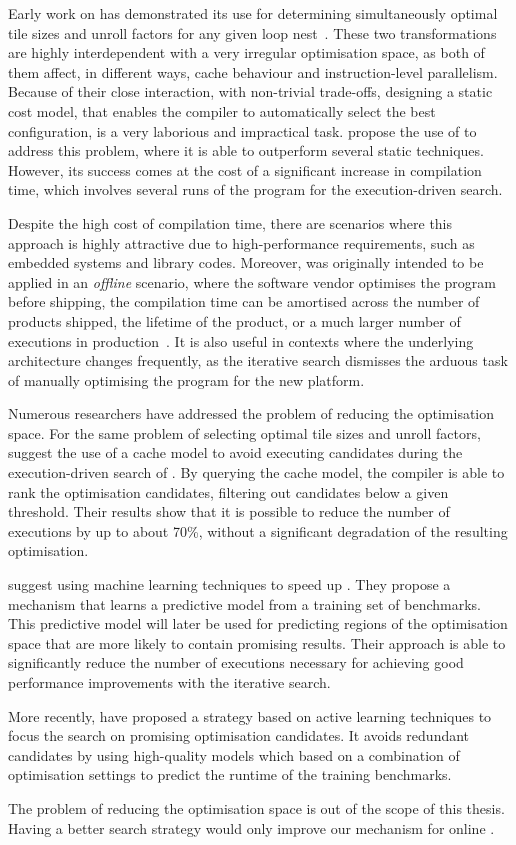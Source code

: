 Early work on {\itercomp} has demonstrated its use for determining simultaneously optimal tile sizes and unroll factors for any given loop nest~\cite{kisuki00,knijnenburg04}.
These two transformations are highly interdependent with a very irregular optimisation space, as both of them affect, in different ways, cache behaviour and instruction-level parallelism.
Because of their close interaction, with non-trivial trade-offs, designing a static cost model, that enables the compiler to automatically select the best configuration, is a very laborious and impractical task.
\cite{kisuki00} propose the use of {\itercomp} to address this problem, where it is able to outperform several static techniques.
However, its success comes at the cost of a significant increase in compilation time, which involves several runs of the program for the execution-driven search.

Despite the high cost of compilation time, there are scenarios where this approach is highly attractive due to high-performance requirements, such as embedded systems and library codes.
Moreover, {\itercomp} was originally intended to be applied in an \textit{offline} scenario, where the software vendor optimises the program before shipping, the compilation time can be amortised across the number of products shipped, the lifetime of the product, or a much larger number of executions in production~\cite{kisuki99,kisuki00,chen10}.
It is also useful in contexts where the underlying architecture changes frequently, as the iterative search dismisses the arduous task of manually optimising the program for the new platform.

Numerous researchers have addressed the problem of reducing the optimisation space.
For the same problem of selecting optimal tile sizes and unroll factors, \cite{knijnenburg04} suggest the use of a cache model to avoid executing candidates during the execution-driven search of {\itercomp}.
By querying the cache model, the compiler is able to rank the optimisation candidates, filtering out candidates below a given threshold.
Their results show that it is possible to reduce the number of executions by up to about 70\%, without a significant degradation of the resulting optimisation.

\cite{agakov06} suggest using machine learning techniques to speed up {\itercomp}.
They propose a mechanism that learns a predictive model from a training set of benchmarks.
This predictive model will later be used for predicting regions of the optimisation space that are more likely to contain promising results.
Their approach is able to significantly reduce the number of executions necessary for achieving good performance improvements with the iterative search.

More recently, \cite{ogilvie17} have proposed a strategy based on active learning techniques to focus the search on promising optimisation candidates.
It avoids redundant candidates 
by using high-quality models which based on a combination of optimisation settings to predict the runtime of the training benchmarks.

The problem of reducing the optimisation space is out of the scope of this thesis.
Having a better search strategy would only improve our mechanism for online {\itercomp}.

